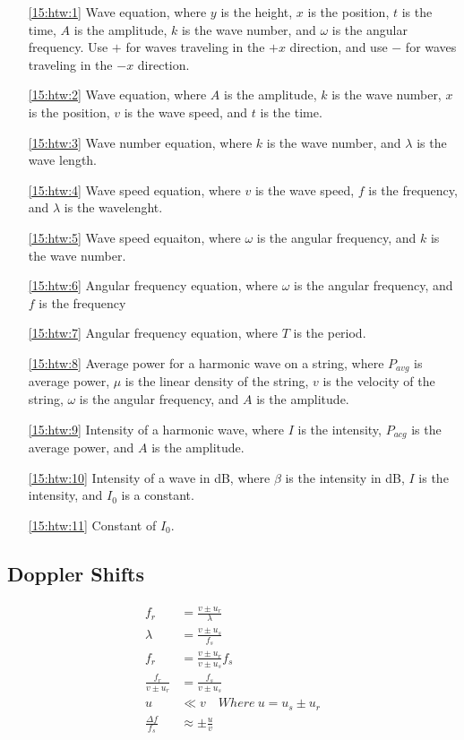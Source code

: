 \documentclass{subfile}
\begin{document}
\begin{enumerate}
	\item[\eqref{15:htw:1}] Wave equation, where $y$ is the height, $x$ is the position, $t$ is the time, $A$ is the amplitude, $k$ is the wave number, and $\omega$ is the angular frequency. Use $+$ for waves traveling in the $+x$ direction, and use $-$ for waves traveling in the $-x$ direction.
	\item[\eqref{15:htw:2}] Wave equation, where $A$ is the amplitude, $k$ is the wave number, $x$ is the position, $v$ is the wave speed, and $t$ is the time.
	\item[\eqref{15:htw:3}] Wave number equation, where $k$ is the wave number, and $\lambda$ is the wave length.
	\item[\eqref{15:htw:4}] Wave speed equation, where $v$ is the wave speed, $f$ is the frequency, and $\lambda$ is the wavelenght.
	\item[\eqref{15:htw:5}] Wave speed equaiton, where $\omega$ is the angular frequency, and $k$ is the wave number.
	\item[\eqref{15:htw:6}] Angular frequency equation, where $\omega$ is the angular frequency, and $f$ is the frequency
	\item[\eqref{15:htw:7}] Angular frequency equation, where $T$ is the period.
	\item[\eqref{15:htw:8}] Average power for a harmonic wave on a string, where $P_{avg}$ is average power, $\mu$ is the linear density of the string, $v$ is the velocity of the string, $\omega$ is the angular frequency, and $A$ is the amplitude.
	\item[\eqref{15:htw:9}] Intensity of a harmonic wave, where $I$ is the intensity, $P_{acg}$ is the average power, and $A$ is the amplitude.
	\item[\eqref{15:htw:10}] Intensity of a wave in dB, where $\beta$ is the intensity in dB, $I$ is the intensity, and $I_{0}$ is a constant.
	\item[\eqref{15:htw:11}] Constant of $I_{0}$.
\end{enumerate}

\subsection{Doppler Shifts}

\begin{align}
	f_{r} &= \frac{v \pm u_{r}}{\lambda} \label{15:ds:1}\\
	\lambda &= \frac{v \pm u_{s}}{f_{s}} \label{15:ds:2}\\
	f_{r} &= \frac{v \pm u_{r}}{v \pm u_{s}}f_{s} \label{15:ds:3}\\
	\frac{f_{r}}{v \pm u_{r}} &= \frac{f_{s}}{v \pm u_{s}} \label{15:ds:4}\\
	u &\ll v\quad Where\ u = u_{s} \pm u_{r} \label{15:ds:5}\\
	\frac{\Delta f}{f_{s}} &\approx \pm \frac{u}{v} \label{15:ds:6}
\end{align}
\end{document}
